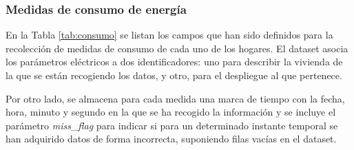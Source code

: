 \subsubsection{Medidas de consumo de energía}

En la Tabla \ref{tab:consumo} se listan los campos que han sido definidos para la recolección de medidas de consumo de cada uno de los hogares. El dataset asocia los parámetros eléctricos a dos identificadores: uno para describir la vivienda de la que se están recogiendo los datos, y otro, para el despliegue al que pertenece. 

\vspace{3mm}

Por otro lado, se almacena para cada medida una marca de tiempo con la fecha, hora, minuto y segundo en la que se ha recogido la información y se incluye el parámetro \textit{miss\_flag} para indicar si para un determinado instante temporal se han adquirido datos de forma incorrecta, suponiendo filas vacías en el dataset.

\clearpage

